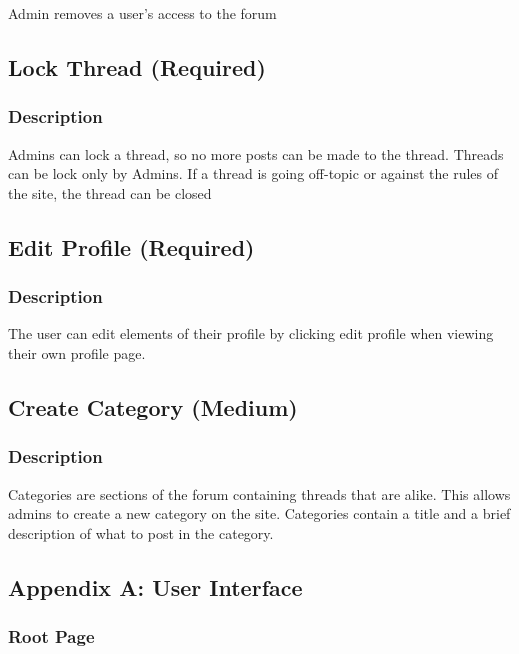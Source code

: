 \documentclass[12pt]{scrartcl}
\begin{document}
Admin removes a user’s access to the forum

\subsection{Lock Thread (Required)}
\subsubsection{Description}
Admins can lock a thread, so no more posts can be made to the thread. Threads can be lock only by Admins.
If a thread is going off-topic or against the rules of the site, the thread can be closed 


\subsection{Edit Profile (Required)}
\subsubsection{Description}
The user can edit elements of their profile by clicking edit profile when viewing their own profile page.

\subsection{Create Category (Medium)}
\subsubsection{Description}
Categories are sections of the forum containing threads that are alike.
This allows admins to create a new category on the site. Categories contain a title and a brief description of what to post in the category.






\subsection{Appendix A: User Interface}

\subsubsection{Root Page}
\end{document}
